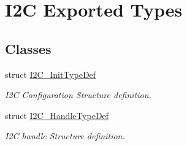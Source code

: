 \hypertarget{group___i2_c___exported___types}{}\section{I2C Exported Types}
\label{group___i2_c___exported___types}
\subsection*{Classes}
\begin{DoxyCompactItemize}
\item 
struct \hyperlink{struct_i2_c___init_type_def}{I2\+C\+\_\+\+Init\+Type\+Def}
\begin{DoxyCompactList}\small\item\em I2C Configuration Structure definition. \end{DoxyCompactList}\item 
struct \hyperlink{struct_i2_c___handle_type_def}{I2\+C\+\_\+\+Handle\+Type\+Def}
\begin{DoxyCompactList}\small\item\em I2C handle Structure definition. \end{DoxyCompactList}\end{DoxyCompactItemize}
